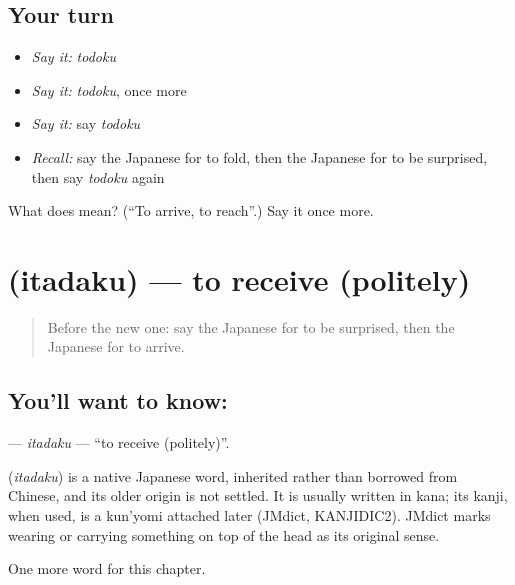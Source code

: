 \subsection*{Your turn}
\begin{itemize}
\raggedright
  \item \emph{Say it:} \emph{todoku}
  \item \emph{Say it:} \emph{todoku}, once more
  \item \emph{Say it:} say \emph{todoku}
  \item \emph{Recall:} say the Japanese for to fold, then the Japanese for to be surprised, then say \emph{todoku} again
\end{itemize}

\begin{tcolorbox}[breakable,colback=teal!4,colframe=teal!35!black,title={Before you move on}]
What does  mean? (\textquotedblleft{}To arrive, to reach\textquotedblright{}.) Say it once more.
\end{tcolorbox}
\section[\texorpdfstring{\ja{いただく} (itadaku)}{いただく (itadaku)}]{ (itadaku) — to receive (politely)}

\label{lesson:JA-C90-itadaku}



\begin{quote}
Before the new one: say the Japanese for to be surprised, then the Japanese for to arrive.
\end{quote}

\subsection*{You'll want to know: }
\textbf{} — \emph{itadaku} — \textquotedblleft{}to receive (politely)\textquotedblright{}.

\begin{cousinweb}
\textbf{} (\emph{itadaku}) is a native Japanese word, inherited rather than borrowed from Chinese, and its older origin is not settled. It is usually written in kana; its kanji, when used, is a kun'yomi attached later (JMdict, KANJIDIC2). JMdict marks wearing or carrying something on top of the head as its original sense.
\end{cousinweb}

\begin{grammarlens}[title={What you've built}]
One more word for this chapter.
\end{grammarlens}

